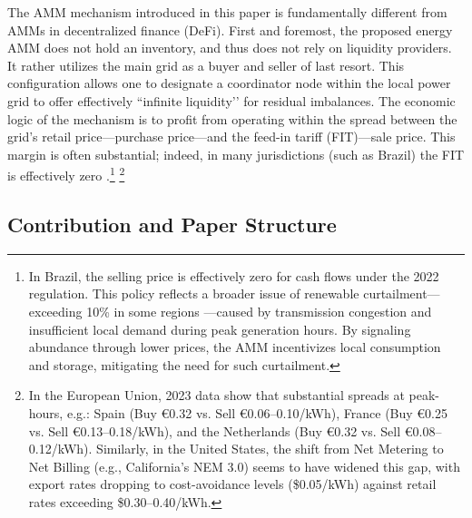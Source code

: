 \documentclass[12pt, notitlepage]{article}
\begin{document}
The AMM mechanism introduced in this paper is fundamentally different from AMMs in decentralized finance (DeFi).
First and foremost, the proposed energy AMM does not hold an inventory, and thus does not rely on liquidity providers. 
It rather utilizes the main grid as a buyer and seller of last resort.
This configuration allows one to designate a coordinator node within the local power grid to offer effectively “infinite liquidity’’ for residual imbalances.
The economic logic of the mechanism is to profit from operating within the spread between the grid's retail price---purchase price---and the feed-in tariff (FIT)---sale price.
This margin is often substantial; indeed, in many jurisdictions (such as Brazil) the FIT is effectively zero \citep{epe2022nota}.\footnote{In Brazil, the selling price is effectively zero for cash flows under the 2022 regulation. This policy reflects a broader issue of renewable curtailment---exceeding 10\% in some regions \citep{ONS_PEN2024}---caused by transmission congestion and insufficient local demand during peak generation hours. By signaling abundance through lower prices, the AMM incentivizes local consumption and storage, mitigating the need for such curtailment.}
\footnote{In the European Union, 2023 data show that substantial spreads at peak-hours, e.g.: Spain (Buy €0.32 vs. Sell €0.06--0.10/kWh), France (Buy €0.25 vs. Sell €0.13--0.18/kWh), and the Netherlands (Buy €0.32 vs. Sell €0.08--0.12/kWh). Similarly, in the United States, the shift from Net Metering to Net Billing (e.g., California's NEM 3.0) seems to have widened this gap, with export rates dropping to cost-avoidance levels (\$0.05/kWh) against retail rates exceeding \$0.30--0.40/kWh.}

\subsection{Contribution and Paper Structure}
\end{document}
